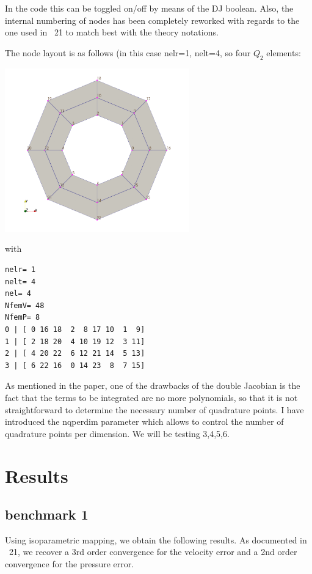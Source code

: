 In the code this can be toggled on/off by means of the {\python DJ} boolean.
Also, the internal numbering of nodes has been completely reworked with regards to 
the one used in \stone~21 to match best with the theory notations.

The node layout is as follows (in this case nelr=1, nelt=4, so four $Q_2$ elements:

\begin{center}
\includegraphics[width=8cm]{python_codes/fieldstone_133/images/nodes}
\end{center}
with
\begin{verbatim}
nelr= 1
nelt= 4
nel= 4
NfemV= 48
NfemP= 8
0 | [ 0 16 18  2  8 17 10  1  9]
1 | [ 2 18 20  4 10 19 12  3 11]
2 | [ 4 20 22  6 12 21 14  5 13]
3 | [ 6 22 16  0 14 23  8  7 15]
\end{verbatim}

As mentioned in the paper, one of the drawbacks of the double Jacobian 
is the fact that the terms to be integrated are no more polynomials, so
that it is not straightforward to determine the necessary number of 
quadrature points. I have introduced the {\python nqperdim} parameter
which allows to control the number of quadrature points per dimension.
We will be testing 3,4,5,6. 

\section*{Results}

\subsection*{benchmark 1}

Using isoparametric mapping, we obtain the following results.
As documented in \stone~21, we recover a 3rd order convergence for the velocity error
and a 2nd order convergence for the pressure error.

